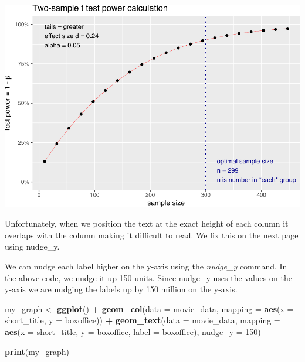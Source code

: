 \documentclass[
]{krantz}
\makeatletter
\newenvironment{Shaded}{\begin{snugshade}}{\end{snugshade}}
\newcommand{\DataTypeTok}[1]{\textcolor[rgb]{0.27,0.27,0.27}{#1}}
\newcommand{\DecValTok}[1]{\textcolor[rgb]{0.06,0.06,0.06}{#1}}
\newcommand{\KeywordTok}[1]{\textcolor[rgb]{0.27,0.27,0.27}{\textbf{#1}}}
\newcommand{\NormalTok}[1]{#1}
\newcommand{\OperatorTok}[1]{\textcolor[rgb]{0.43,0.43,0.43}{\textbf{#1}}}
\newcommand{\StringTok}[1]{\textcolor[rgb]{0.5,0.5,0.5}{#1}}
\newenvironment{kframe}{%
\medskip{}
\setlength{\fboxsep}{.8em}
 \def\at@end@of@kframe{}%
 \ifinner\ifhmode%
  \def\at@end@of@kframe{\end{minipage}}%
  \begin{minipage}{\columnwidth}%
 \fi\fi%
 \def\FrameCommand##1{\hskip\@totalleftmargin \hskip-\fboxsep
 \colorbox{shadecolor}{##1}\hskip-\fboxsep
     \hskip-\linewidth \hskip-\@totalleftmargin \hskip\columnwidth}%
 \MakeFramed {\advance\hsize-\width
   \@totalleftmargin\z@ \linewidth\hsize
   \@setminipage}}%
 {\par\unskip\endMakeFramed%
 \at@end@of@kframe}
\renewenvironment{Shaded}{\begin{kframe}}{\end{kframe}}
\makeatother
\begin{document}
\includegraphics{bookdown_files/figure-latex/unnamed-chunk-240-1.pdf}

Unfortunately, when we position the text at the exact height of each column it overlaps with the column making it difficult to read. We fix this on the next page using nudge\_y.

We can nudge each label higher on the y-axis using the \emph{nudge\_y} command. In the above code, we nudge it up 150 units. Since nudge\_y uses the values on the y-axis we are nudging the labels up by 150 million on the y-axis.

\begin{Shaded}
\begin{Highlighting}[]
\NormalTok{my_graph <-}\StringTok{ }\KeywordTok{ggplot}\NormalTok{() }\OperatorTok{+}
\StringTok{  }\KeywordTok{geom_col}\NormalTok{(}\DataTypeTok{data =}\NormalTok{ movie_data,}
           \DataTypeTok{mapping =} \KeywordTok{aes}\NormalTok{(}\DataTypeTok{x =}\NormalTok{ short_title, }
                         \DataTypeTok{y =}\NormalTok{ boxoffice)) }\OperatorTok{+}
\StringTok{  }\KeywordTok{geom_text}\NormalTok{(}\DataTypeTok{data =}\NormalTok{ movie_data, }
           \DataTypeTok{mapping =} \KeywordTok{aes}\NormalTok{(}\DataTypeTok{x =}\NormalTok{ short_title, }
                         \DataTypeTok{y =}\NormalTok{ boxoffice, }
                         \DataTypeTok{label =}\NormalTok{ boxoffice),}
           \DataTypeTok{nudge_y =} \DecValTok{150}\NormalTok{)}

\KeywordTok{print}\NormalTok{(my_graph)}
\end{Highlighting}
\end{Shaded}
\end{document}
